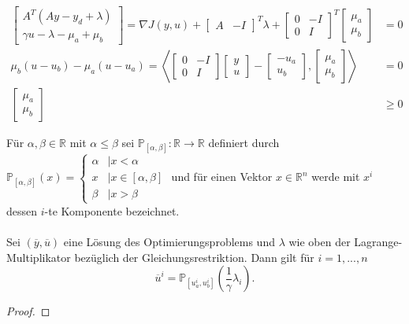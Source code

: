 \begin{compactenum}[(i)]
\begin{align*}
\begin{bmatrix}A^T(Ay-y_d+\lambda)\\\gamma u-\lambda-\mu_a+\mu_b\end{bmatrix}=\nabla J(y,u)+\begin{bmatrix}A&-I\end{bmatrix}^T\lambda+\begin{bmatrix}0&-I\\0&I\end{bmatrix}^T\begin{bmatrix}\mu_a\\\mu_b\end{bmatrix}&=0\\\mu_b(u-u_b)-\mu_a(u-u_a)=\left\langle\begin{bmatrix}0&-I\\0&I\end{bmatrix}\begin{bmatrix}y\\u\end{bmatrix}-\begin{bmatrix}-u_a\\u_b\end{bmatrix} ,\begin{bmatrix}\mu_a\\\mu_b\end{bmatrix} \right\rangle &=0\\\begin{bmatrix}\mu_a\\\mu_b\end{bmatrix}&\geq 0\end{align*}\newline
\item Für $\alpha,\beta\in\mathbb R$ mit $\alpha\leq\beta$ sei $\mathbb P_{[\alpha,\beta]}:\mathbb R\to\mathbb R$ definiert durch $\mathbb P_{[\alpha,\beta]}(x)=\begin{cases}\alpha&\mid x<\alpha\\x&\mid x\in[\alpha,\beta]\\\beta&\mid x>\beta\end{cases}$
und für einen Vektor $x\in\mathbb R^n$ werde mit $x^i$ dessen $i$-te Komponente bezeichnet. \\\\
Sei $(\overline y,\overline u)$ eine Lösung des Optimierungsproblems und $\lambda$ wie oben der Lagrange-Multiplikator bezüglich der Gleichungsrestriktion. Dann gilt für $i=1,...,n$
$$\overline u^i = \mathbb P_{[u_a^i,u_b^i]}\left(\frac{1}{\gamma}\lambda_i\right).$$
\begin{proof}

\end{proof}
\end{compactenum}
